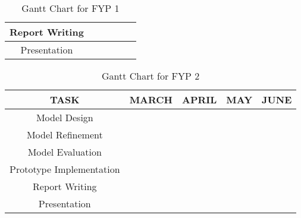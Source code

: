 \begin{table}[]
\begin{tabular}{|c|c|c|c|c|c|}
Report Writing                                                                          & \cellcolor[HTML]{FFCB2F} & \cellcolor[HTML]{FFCB2F} & \cellcolor[HTML]{FFCB2F} & \cellcolor[HTML]{FFCB2F} & \cellcolor[HTML]{FFCB2F} \\ \hline
Presentation                                                                            & \cellcolor[HTML]{EFEFEF} & \cellcolor[HTML]{EFEFEF} & \cellcolor[HTML]{EFEFEF} & \cellcolor[HTML]{EFEFEF} & \cellcolor[HTML]{FFCB2F} \\ \hline
\end{tabular}
\caption{Gantt Chart for FYP 1}
\label{tab:gantt-chart-fyp1}
\end{table}


\begin{table}[]
\begin{tabular}{|c|c|c|c|c|}
\hline
\textbf{TASK}            & \textbf{MARCH}           & \textbf{APRIL}           & \textbf{MAY}             & \textbf{JUNE}                                   \\ \hline
Model Design             & \cellcolor[HTML]{FFCB2F} & \cellcolor[HTML]{EFEFEF} & \cellcolor[HTML]{EFEFEF} & \cellcolor[HTML]{EFEFEF}                        \\ \hline
Model Refinement         & \cellcolor[HTML]{EFEFEF} & \cellcolor[HTML]{FFCB2F} & \cellcolor[HTML]{FFCB2F} & \cellcolor[HTML]{EFEFEF}                        \\ \hline
Model Evaluation         & \cellcolor[HTML]{EFEFEF} & \cellcolor[HTML]{FFCB2F} & \cellcolor[HTML]{FFCB2F} & \cellcolor[HTML]{EFEFEF}                        \\ \hline
Prototype Implementation & \cellcolor[HTML]{EFEFEF} & \cellcolor[HTML]{EFEFEF} & \cellcolor[HTML]{FFCB2F} & \cellcolor[HTML]{FFCB2F}                        \\ \hline
Report Writing           & \cellcolor[HTML]{FFCB2F} & \cellcolor[HTML]{FFCB2F} & \cellcolor[HTML]{FFCB2F} & \cellcolor[HTML]{FFCB2F}                        \\ \hline
Presentation             & \cellcolor[HTML]{EFEFEF} & \cellcolor[HTML]{EFEFEF} & \cellcolor[HTML]{EFEFEF} & \cellcolor[HTML]{FFCB2F}{\color[HTML]{FFCB2F} } \\ \hline
\end{tabular}
\caption{Gantt Chart for FYP 2}
\label{tab:gantt-chart-fyp2}
\end{table}

